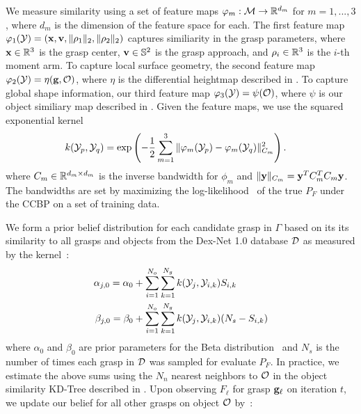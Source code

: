 We measure similarity using a set of feature maps $\varphi_m: \mathcal{M} \rightarrow \mathbb{R}^{d_m}$ for $m = 1, ..., 3$, where $d_m$ is the dimension of the feature space for each.
The first feature map $\varphi_{1}(\mathcal{Y}) = (\mathbf{x}, \mathbf{v}, \| \rho_1 \|_2, \| \rho_2 \|_2)$ captures similiarity in the grasp parameters, where $\mathbf{x} \in \mathbb{R}^3$ is the grasp center, $\mathbf{v} \in \mathbb{S}^2$ is the grasp approach, and $\rho_i \in \mathbb{R}^3$ is the $i$-th moment arm.
To capture local surface geometry, the second feature map $\varphi_{2}(\mathcal{Y}) = \eta(\mathbf{g}, \mathcal{O})$, where $\eta$ is the differential heightmap described in .
To capture global shape information, our third feature map $\varphi_{3}(\mathcal{Y}) = \psi(\mathcal{O})$, where $\psi$ is our object similiary map described in .
Given the feature maps, we use the squared exponential kernel 
\begin{align*}
	k(\mathcal{Y}_p, \mathcal{Y}_q) &= \exp\left( - \frac{1}{2} \sum \limits_{m=1}^{3} \|\varphi_m(\mathcal{Y}_p) - \varphi_m(\mathcal{Y}_q)\|_{C_m}^2 \right).
\end{align*}
\noindent where $C_m \in \mathbb{R}^{d_m \times d_m}$ is the inverse bandwidth for $\phi_m$ and $\| \mathbf{y} \|_{C_m} = \mathbf{y}^T C_m^T C_m \mathbf{y}$.
The bandwidths are set by maximizing the log-likelihood~\cite{goetschalckx2011continuous} of the true $P_F$ under the CCBP on a set of training data.

We form a prior belief distribution for each candidate grasp in $\Gamma$ based on its its similarity to all grasps and objects from the Dex-Net 1.0 database $\mathcal{D}$ as measured by the kernel~\cite{goetschalckx2011continuous}:
\begin{align}
	\alpha_{j,0} = \alpha_{0} & + \sum \limits_{i=1}^{N_o} \sum \limits_{k=1}^{N_g} k(\mathcal{Y}_{j}, \mathcal{Y}_{i, k}) S_{i,k} \label{eq:alpha-prior} \\
	\beta_{j,0} = \beta_{0} & + \sum \limits_{i=1}^{N_o} \sum \limits_{k=1}^{N_g}  k(\mathcal{Y}_{j}, \mathcal{Y}_{i,k}) (N_s - S_{i,k}) \label{eq:beta-prior}
\end{align}
\noindent where $\alpha_{0}$ and $\beta_{0}$ are prior parameters for the Beta distribution~\cite{laskey2015bandits} and $N_s$ is the number of times each grasp in $\mathcal{D}$ was sampled for evaluate $P_F$.
In practice, we estimate the above sums using the $N_n$ nearest neighbors to $\mathcal{O}$ in the object similarity KD-Tree described in .
Upon observing $F_{\ell}$ for grasp $\mathbf{g}_{\ell}$ on iteration $t$, we update our belief for all other grasps on object $\mathcal{O}$ by~\cite{goetschalckx2011continuous}:

